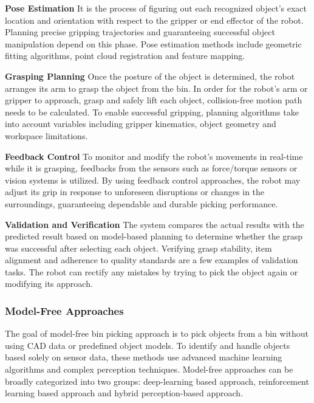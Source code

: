\vspace{5mm}

\textbf{Pose Estimation} It is the process of figuring out each recognized object's exact location and orientation with respect to the gripper or end effector of the robot. Planning precise gripping trajectories and guaranteeing successful object manipulation depend on this phase. Pose estimation methods include geometric fitting algorithms, point cloud registration and feature mapping.\cite{lin2020robotic}

\vspace{5mm}

\textbf{Grasping Planning} Once the posture of the object is determined, the robot arranges its arm to grasp the object from the bin. In order for the robot's arm or gripper to approach, grasp and safely lift each object, collision-free motion path needs to be calculated. To enable successful gripping, planning algorithms take into account variables including gripper kinematics, object geometry and workspace limitations.\cite{lin2020robotic}

\vspace{5mm}

\textbf{Feedback Control} To monitor and modify the robot's movements in real-time while it is grasping, feedbacks from the sensors such as force/torque sensors or vision systems is utilized. By using feedback control approaches, the robot may adjust its grip in response to unforeseen disruptions or changes in the surroundings, guaranteeing dependable and durable picking performance.\cite{lin2020robotic}

\vspace{5mm}

\textbf{Validation and Verification} The system compares the actual results with the predicted result based on model-based planning to determine whether the grasp was successful after selecting each object. Verifying grasp stability, item alignment and adherence to quality standards are a few examples of validation tasks. The robot can rectify any mistakes by trying to pick the object again or modifying its approach.\cite{lin2020robotic}

\subsubsection{Model-Free Approaches}
The goal of model-free bin picking approach is to pick objects from a bin without using \ac{CAD} data or predefined object models. To identify and handle objects based solely on sensor data, these methods use advanced machine learning algorithms and complex perception techniques. Model-free approaches can be broadly categorized into two groups: deep-learning based approach\cite{bousmalis2018using}, reinforcement learning based approach\cite{levine2018learning} and hybrid perception-based approach\cite{jang2018grasp2vec}. 

